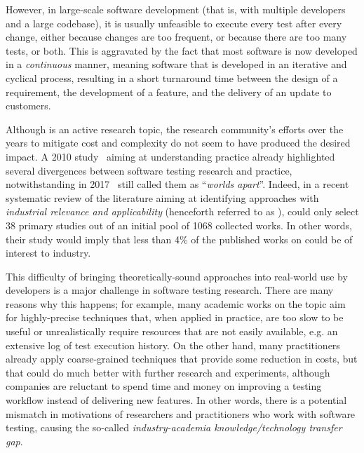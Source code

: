 However, in large-scale software development (that is, with multiple developers and a large codebase), it is usually unfeasible to execute every test after every change, either because changes are too frequent, or because there are too many tests, or both.
This is aggravated by the fact that most software is now developed in a \textit{continuous} manner, meaning software that is developed in an iterative and cyclical process, resulting in a short turnaround time between the design of a requirement, the development of a feature, and the delivery of an update to customers.


Although \rt is an active research topic, the research community's efforts over the years to mitigate \rt cost and complexity do not seem to have produced the desired impact.
A 2010 study~\cite{engstrom2010qualitative} aiming at understanding \rt practice already highlighted several divergences between software testing research and practice,
notwithstanding in 2017~\citet{garousi2017worlds}  
still called them as ``\textit{worlds apart}''. 
Indeed, in a recent systematic review of the \rt literature aiming at identifying approaches with \textit{industrial relevance and applicability} (henceforth referred to as \rea),
\citet{bin_ali_search_2019} could  only select 38 primary studies out of an initial pool of 1068 collected works.
In other words, their study would imply that 
less than 4\% of the published works on \rt could be of interest to industry.

This difficulty of bringing theoretically-sound approaches into real-world use by developers is a major challenge in software testing research.
There are many reasons why this happens; for example, many academic works on the topic aim for highly-precise techniques that, when applied in practice, are too slow to be useful or unrealistically require resources that are not easily available, e.g. an extensive log of test execution history.
On the other hand, many practitioners already apply coarse-grained techniques that provide some reduction in costs, but that could do much better with further research and experiments, although companies are reluctant to spend time and money on improving a testing workflow instead of delivering new features.
In other words, there is a potential mismatch in motivations of researchers and practitioners who work with software testing, causing the so-called \textit{industry-academia knowledge/technology transfer gap}.

